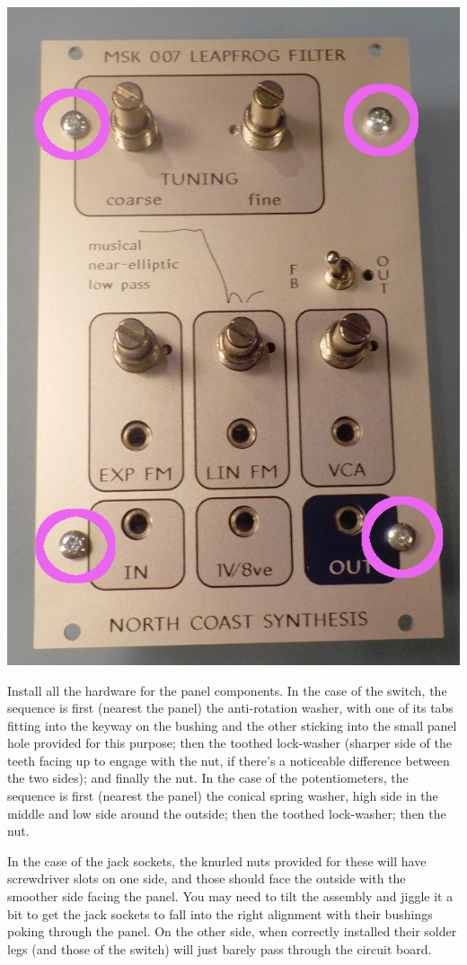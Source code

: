 \noindent\includegraphics[width=\linewidth]{panel-screws.jpg}

Install all the hardware for the panel components.  In the case of the
switch, the sequence is first (nearest the panel) the anti-rotation washer,
with one of its tabs fitting into the keyway on the bushing and the other
sticking into the small panel hole provided for this purpose; then the
toothed lock-washer (sharper side of the teeth facing up to engage with the
nut, if there's a noticeable difference between the two sides); and finally
the nut.  In the case of the potentiometers, the sequence is first (nearest
the panel) the conical spring washer, high side in the middle and low side
around the outside; then the toothed lock-washer; then the nut.

In the case of the jack sockets, the knurled nuts provided for these will
have screwdriver slots on one side, and those should face the outside with
the smoother side facing the panel.  You may need to tilt the assembly and
jiggle it a bit to get the jack sockets to fall into the right alignment
with their bushings poking through the panel.  On the other side, when
correctly installed their solder legs (and those of the switch) will just
barely pass through the circuit board.

